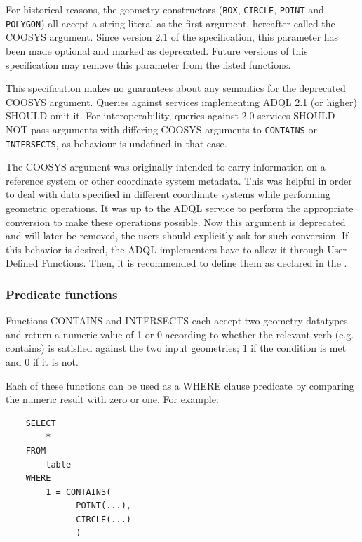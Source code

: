\documentclass[11pt,a4paper]{ivoa}
\begin{document}
For historical reasons, the geometry constructors (\verb:BOX:, \verb:CIRCLE:,
\verb:POINT: and \verb:POLYGON:) all accept a string literal as the first
argument, hereafter called the COOSYS argument. Since version 2.1 of the
specification, this parameter has been made optional and marked as deprecated.
Future versions of this specification may remove this parameter from the listed
functions.

This specification makes no guarantees about any semantics for the deprecated
COOSYS argument. Queries against services implementing ADQL 2.1 (or higher)
SHOULD omit it. For interoperability, queries against 2.0 services SHOULD NOT
pass arguments with differing COOSYS arguments to \verb:CONTAINS: or
\verb:INTERSECTS:, as behaviour is undefined in that case.

The COOSYS argument was originally intended to carry information on
a reference system or other coordinate system metadata. This was helpful in
order to deal with data specified in different coordinate systems while
performing geometric operations. It was up to the ADQL service to perform
the appropriate conversion to make these operations possible. Now this argument
is deprecated and will later be removed, the users should explicitly ask for
such conversion. If this behavior is desired, the ADQL implementers have to
allow it through User Defined Functions. Then, it is recommended to define them
as declared in the \CatalogueUDF{}.

\subsubsection{Predicate functions}
\label{sec:functions.geom.predicate}

Functions CONTAINS and INTERSECTS each accept two geometry datatypes
and return a numeric value of 1 or 0 according to whether the relevant
verb (e.g. contains) is satisfied against the two input geometries;
1 if the condition is met and 0 if it is not.

Each of these functions can be used as a WHERE clause predicate by
comparing the numeric result with zero or one.
For example:
\begin{verbatim}
    SELECT
        *
    FROM
        table
    WHERE
        1 = CONTAINS(
              POINT(...),
              CIRCLE(...)
              )
\end{verbatim}
\end{document}
